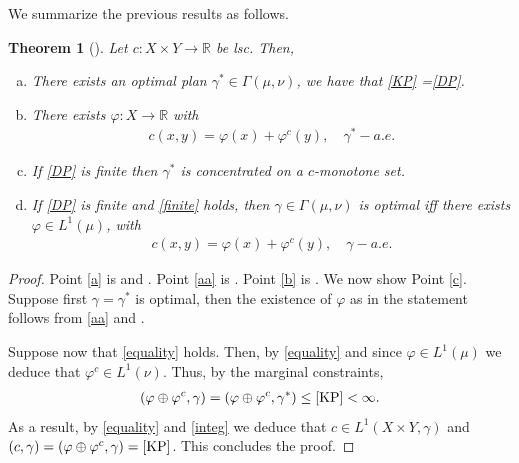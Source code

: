 \documentclass[
    a4paper,
    DIV=14,
    abstract=true,
    numbers=noenddot
]
{scrartcl}
\newtheorem{theorem}{Theorem}[section]
\theoremstyle{definition}
\newcommand{\R}{\mathbb{R}}
\begin{document}
We summarize the previous results as follows.
\begin{theorem}[]
    Let $c: X \times Y \to \R$ be lsc. Then,
    \begin{enumerate}[a)]
        \item There exists an optimal plan $\gamma^* \in \Gamma (\mu ,\nu )$,  we have that \eqref{KP} =\eqref{DP}.\label{a}
                \item \label{b}There exists $\varphi: X \to \R $ with
              \begin{align*}
                  c(x,y)=\varphi (x)+ \varphi^c(y), \quad \gamma^*-a.e.
              \end{align*}
        \item If \eqref{DP} is finite then $\gamma^*$ is concentrated on a $c$-monotone set.  \label{aa}
        \item \label{c} If \eqref{DP} is finite and \eqref{finite} holds, then $\gamma \in \Gamma(\mu ,\nu)$ is optimal iff there exists $\varphi \in L^1(\mu )$,  with
              \begin{align}\label{equality}
                  c(x,y)=\varphi (x)+ \varphi^c(y), \quad \gamma-a.e.
              \end{align}
    \end{enumerate}
\end{theorem}
\begin{proof}
    Point \ref{a} is  and . Point \ref{aa} is . Point \ref{b} is . We now show Point \ref{c}. Suppose first $\gamma = \gamma ^*$ is optimal, then the existence of $\varphi$ as in the statement follows from \ref{aa} and .


    Suppose now that \eqref{equality} holds. Then, by \eqref{equality} and since $\varphi \in L^1(\mu )$ we deduce that $\varphi ^c \in L^1(\nu )$. Thus, by the marginal constraints,
    \begin{align}\label{integ}
        (\varphi \oplus \varphi ^c , \gamma )= (\varphi \oplus \varphi ^c , \gamma^* )\leq \eqref{KP}< \infty.
    \end{align}
    As a result, by \eqref{equality} and \eqref{integ} we deduce that $c \in L^1(X\times Y,\gamma )$ and $(c, \gamma )=(\varphi \oplus \varphi ^c , \gamma ) = \eqref{KP}$. This concludes the proof.
\end{proof}
\end{document}
